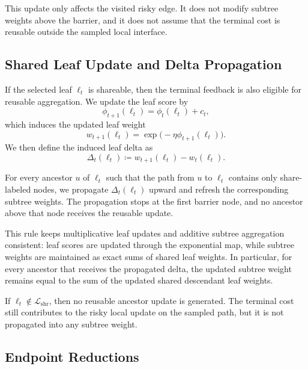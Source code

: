 \documentclass{article}
\begin{document}
This update only affects the visited risky edge. It does not modify subtree weights above the barrier, and it does not assume that the terminal cost is reusable outside the sampled local interface.

\subsection{Shared Leaf Update and Delta Propagation}
\label{sec:barriershare_shared_update}

If the selected leaf $\ell_t$ is shareable, then the terminal feedback is also eligible for reusable aggregation. We update the leaf score by
\begin{equation}
    \phi_{t+1}(\ell_t) = \phi_t(\ell_t) + c_t,
    \label{eq:leaf_score_update}
\end{equation}
which induces the updated leaf weight
\begin{equation}
    w_{t+1}(\ell_t) = \exp\!\bigl(-\eta \phi_{t+1}(\ell_t)\bigr).
    \label{eq:leaf_weight_update}
\end{equation}
We then define the induced leaf delta as
\begin{equation}
    \Delta_t(\ell_t) \coloneqq w_{t+1}(\ell_t) - w_t(\ell_t).
    \label{eq:delta_def}
\end{equation}

For every ancestor $u$ of $\ell_t$ such that the path from $u$ to $\ell_t$ contains only share-labeled nodes, we propagate $\Delta_t(\ell_t)$ upward and refresh the corresponding subtree weights. The propagation stops at the first barrier node, and no ancestor above that node receives the reusable update.

This rule keeps multiplicative leaf updates and additive subtree aggregation consistent: leaf scores are updated through the exponential map, while subtree weights are maintained as exact sums of shared leaf weights. In particular, for every ancestor that receives the propagated delta, the updated subtree weight remains equal to the sum of the updated shared descendant leaf weights.

If $\ell_t \notin \mathcal{L}_{\mathrm{shr}}$, then no reusable ancestor update is generated. The terminal cost still contributes to the risky local update on the sampled path, but it is not propagated into any subtree weight.

\subsection{Endpoint Reductions}
\label{sec:barriershare_reductions}
\end{document}
